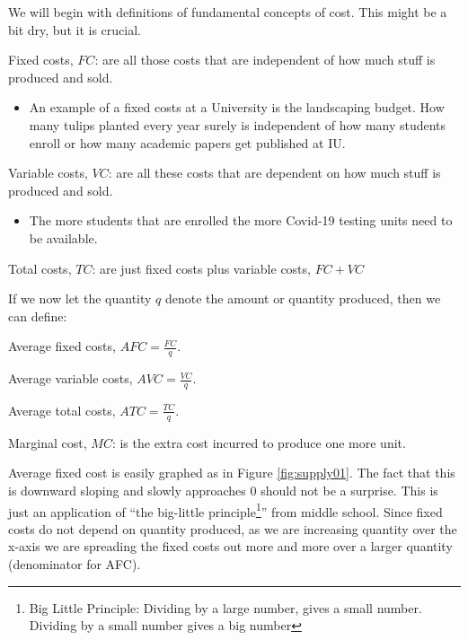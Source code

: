 \documentclass[
]{book}
\providecommand{\tightlist}{%
  \setlength{\itemsep}{0pt}\setlength{\parskip}{0pt}}
\begin{document}
We will begin with definitions of fundamental concepts of cost. This might be a bit dry, but it is crucial.

Fixed costs, \(FC\): are all those costs that are independent of how much stuff is produced and sold.

\begin{itemize}
\tightlist
\item
  An example of a fixed costs at a University is the landscaping budget. How many tulips planted every year surely is independent of how many students enroll or how many academic papers get published at IU.
\end{itemize}

Variable costs, \(VC\): are all these costs that are dependent on how much stuff is produced and sold.

\begin{itemize}
\tightlist
\item
  The more students that are enrolled the more Covid-19 testing units need to be available.
\end{itemize}

Total costs, \(TC\): are just fixed costs plus variable costs, \(FC + VC\)

If we now let the quantity \(q\) denote the amount or quantity produced, then we can define:

Average fixed costs, \(AFC = \frac{FC}{q}\).

Average variable costs, \(AVC = \frac{VC}{q}\).

Average total costs, \(ATC = \frac{TC}{q}\).

Marginal cost, \(MC\): is the extra cost incurred to produce one more unit.

Average fixed cost is easily graphed as in Figure \ref{fig:supply01}. The fact that this is downward sloping and slowly approaches 0 should not be a surprise. This is just an application of ``the big-little principle\footnote{Big Little Principle: Dividing by a large number, gives a small number. Dividing by a small number gives a big number}'' from middle school. Since fixed costs do not depend on quantity produced, as we are increasing quantity over the x-axis we are spreading the fixed costs out more and more over a larger quantity (denominator for AFC).
\end{document}
